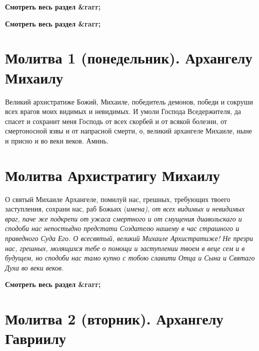


\bfseries Смотреть весь раздел &rarr;\normalfont{} 


\bfseries Смотреть весь раздел &rarr;\normalfont{} 

\section{Молитва 1 (понедельник). Архангелу Михаилу}
 

Великий архистратиже Божий, Михаиле, победитель демонов, победи и сокруши всех врагов моих видимых и невидимых. И умоли Господа Вседержителя, да спасет и сохранит меня Господь от всех скорбей и от всякой болезни, от смертоносной язвы и от напрасной смерти, о, великий архангеле Михаиле, ныне и присно и во веки веков. Аминь.





\section{Молитва Архистратигу Михаилу}
 


О святый Михаиле Архангеле, помилуй нас, грешных, требующих твоего заступления, сохрани нас, раб Божьих (\itshape имена\normalfont{}), от всех видимых и невидимых враг, паче же подкрепи от ужаса смертного и от смущения диавольскаго и сподоби нас непостыдно предстати Создателю нашему в час страшного и праведного Суда Его. О всесвятый, великий Михаиле Архистратиже! Не презри нас, грешных, молящихся тебе о помощи и заступлении твоем в веце сем и в будущем, но сподоби нас тамо купно с тобою славити Отца и Сына и Святаго Духа во веки веков.


\mychapterending


\bfseries Смотреть весь раздел &rarr;\normalfont{} 

\section{Молитва 2 (вторник).    Архангелу Гавриилу}
 


